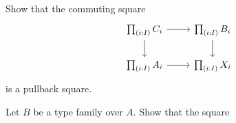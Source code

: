\begin{exercises}
\begin{subexenum}
\item \label{ex:pb_pi}Show that the commuting square
\begin{equation*}
\begin{tikzcd}
\prd{i:I}C_i \arrow[r] \arrow[d] & \prd{i:I}B_i \arrow[d] \\
\prd{i:I}A_i \arrow[r] & \prd{i:I}X_i
\end{tikzcd}
\end{equation*}
is a pullback square.
\end{subexenum}
\item \label{ex:pi_sec}Let $B$ be a type family over $A$. Show that the square
\begin{equation*}
\begin{tikzcd}[column sep=6em]

\end{tikzcd}
\end{equation*}
\end{exercises}
